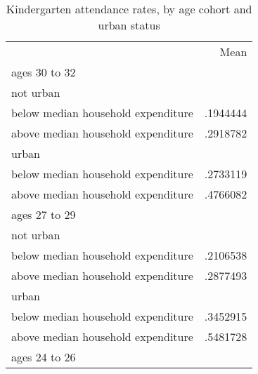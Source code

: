 \begin{table}[!h]
\caption{Kindergarten attendance rates, by age cohort and urban status}
\centering
\begin{tabular}{ll}
\cline{1-2}
\multicolumn{1}{c}{} &
  \multicolumn{1}{|r}{Mean} \\
\cline{1-2}
\multicolumn{1}{l}{ages 30 to 32} &
  \multicolumn{1}{|r}{} \\
\multicolumn{1}{l}{\hspace{1em}not urban} &
  \multicolumn{1}{|r}{} \\
\multicolumn{1}{l}{\hspace{2em}below median household expenditure} &
  \multicolumn{1}{|r}{.1944444} \\
\multicolumn{1}{l}{\hspace{2em}above median household expenditure} &
  \multicolumn{1}{|r}{.2918782} \\
\multicolumn{1}{l}{\hspace{1em}urban} &
  \multicolumn{1}{|r}{} \\
\multicolumn{1}{l}{\hspace{2em}below median household expenditure} &
  \multicolumn{1}{|r}{.2733119} \\
\multicolumn{1}{l}{\hspace{2em}above median household expenditure} &
  \multicolumn{1}{|r}{.4766082} \\
\multicolumn{1}{l}{ages 27 to 29} &
  \multicolumn{1}{|r}{} \\
\multicolumn{1}{l}{\hspace{1em}not urban} &
  \multicolumn{1}{|r}{} \\
\multicolumn{1}{l}{\hspace{2em}below median household expenditure} &
  \multicolumn{1}{|r}{.2106538} \\
\multicolumn{1}{l}{\hspace{2em}above median household expenditure} &
  \multicolumn{1}{|r}{.2877493} \\
\multicolumn{1}{l}{\hspace{1em}urban} &
  \multicolumn{1}{|r}{} \\
\multicolumn{1}{l}{\hspace{2em}below median household expenditure} &
  \multicolumn{1}{|r}{.3452915} \\
\multicolumn{1}{l}{\hspace{2em}above median household expenditure} &
  \multicolumn{1}{|r}{.5481728} \\
\multicolumn{1}{l}{ages 24 to 26} &

\end{tabular}
\end{table}
